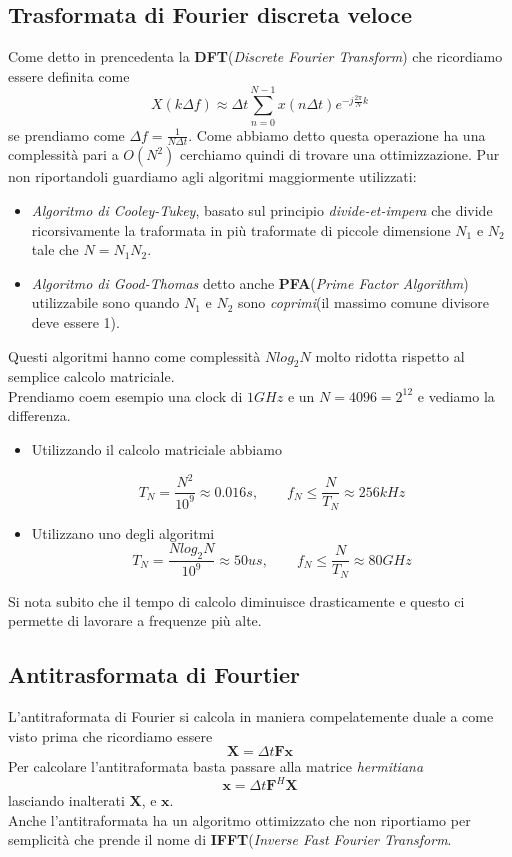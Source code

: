 \subsection{Trasformata di Fourier discreta veloce}
Come detto in prencedenta la \textbf{DFT}(\textit{Discrete Fourier Transform}) 
che ricordiamo essere definita come 
\[
    X(k\Delta f) \approx \Delta t \sum_{n = 0}^{N - 1} x(n\Delta t)e^{- j \frac{2 \pi}{N} k }
\]
se prendiamo come $\Delta f = \frac{1}{N \Delta t}$. 
Come abbiamo detto questa operazione ha una complessità pari a $O(N^2)$ cerchiamo 
quindi di trovare una ottimizzazione. 
Pur non riportandoli guardiamo agli algoritmi maggiormente utilizzati:
\begin{itemize}
    \item \textit{Algoritmo di Cooley-Tukey}, basato sul principio \textit{divide-et-impera}
        che divide ricorsivamente la traformata in più traformate di piccole
        dimensione $N_1$ e $N_2$ tale che $N = N_1N_2$. 
    \item \textit{Algoritmo di Good-Thomas} detto anche \textbf{PFA}(\textit{Prime Factor Algorithm})
        utilizzabile sono quando $N_1$ e $N_2$ sono \textit{coprimi}(il massimo comune divisore deve essere 1). 
\end{itemize}
Questi algoritmi hanno come complessità $Nlog_2N$ molto ridotta rispetto al 
semplice calcolo matriciale. \\ 
Prendiamo coem esempio una clock di $1GHz$ e un $N = 4096 = 2^{12}$ e vediamo la differenza. 
\begin{itemize}
    \item Utilizzando il calcolo matriciale abbiamo

        \[
            T_N = \frac{N^2}{10^9} \approx 0.016s, \quad\quad f_N \leq \frac{N}{T_N} \approx 256 kHz
        \]
    \item  Utilizzano uno degli algoritmi
        $$ 
            T_N = \frac{Nlog_2N}{10^9} \approx 50us, \quad\quad f_N \leq \frac{N}{T_N} \approx 80GHz
        $$ 
\end{itemize}
Si nota subito che il tempo di calcolo diminuisce drasticamente e questo ci permette
di lavorare a frequenze più alte.
\subsection{Antitrasformata di Fourtier}
L'antitraformata di Fourier si calcola in maniera compelatemente duale a come visto
prima che ricordiamo essere
$$
    \mathbf X = \Delta t \mathbf F \mathbf x
$$
Per calcolare l'antitraformata basta passare alla matrice \textit{hermitiana}
\[
    \mathbf x = \Delta t \mathbf F^H \mathbf X
\]
lasciando inalterati $\mathbf X$, e $\mathbf x$. \\ 
Anche l'antitraformata ha un algoritmo ottimizzato che non riportiamo per semplicità 
che prende il nome di \textbf{IFFT}(\textit{Inverse Fast Fourier Transform}.
